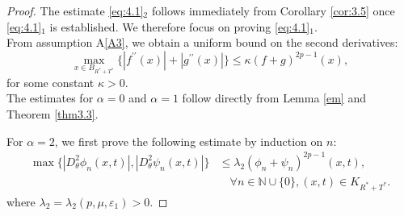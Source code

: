 \documentclass[
  sn-mathphys-num,
  colorlinks,
  linkcolor=darkmagenta,
  citecolor=rufous,
  urlcolor=zaffre,
  hypertexnames=false
]{sn-jnl}
\numberwithin{equation}{section}
\begin{document}
\begin{proof}
The estimate \eqref{eq:4.1}$_2$ follows immediately from Corollary \ref{cor:3.5} once \eqref{eq:4.1}$_1$ is established. We therefore focus on proving \eqref{eq:4.1}$_1$.\\
From assumption A\ref{A3}, we obtain a uniform bound on the second derivatives:
\begin{equation}\label{eq:4.3}
\max_{x\in B_{R^{*}+T^{*}}} \bigl\{|f^{\prime\prime}(x)| + |g^{\prime\prime}(x)|\bigr\}  \leq\kappa(f+g)^{2p-1}(x),
\end{equation}
for some constant $\kappa > 0$.\\
The estimates for $\alpha=0$ and $\alpha=1$ follow directly from Lemma \ref{em} and Theorem \ref{thm3.3}.

\medskip
\noindent For $\alpha=2$, we first prove the following estimate by induction on $n$:
\begin{equation}\label{eq:4.4}
\begin{aligned}
\max\bigl\{ |D_\theta^{2}\phi_n(x,t)|, |D_\theta^{2}\psi_n(x,t)| \bigr\} 
&\leq \lambda_2(\phi_n + \psi_n)^{2p-1}(x,t), \\
&\quad \forall n \in \mathbb{N}\cup\{0\}, (x,t) \in K_{R^{*}+T^{*}}.
\end{aligned}
\end{equation}
where $\lambda_2 = \lambda_2(p,\mu,\varepsilon_1) > 0$.


\end{proof}
\end{document}
